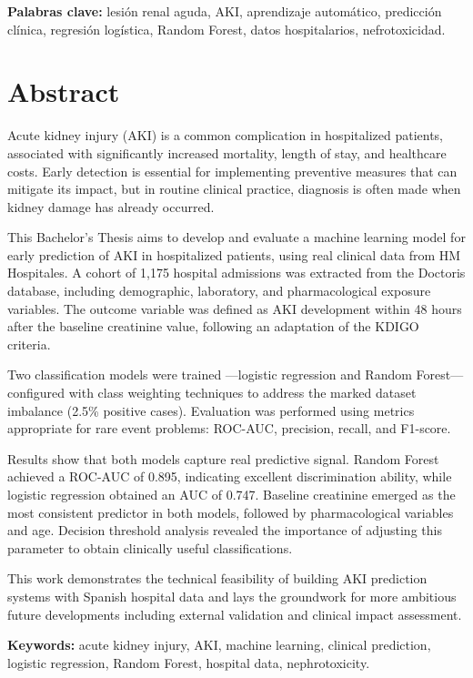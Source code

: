 \documentclass[12pt, a4paper, oneside]{report}
\begin{document}
\vspace{1cm}
\textbf{Palabras clave:} lesión renal aguda, AKI, aprendizaje automático, predicción clínica, regresión logística, Random Forest, datos hospitalarios, nefrotoxicidad.

\chapter*{Abstract}
Acute kidney injury (AKI) is a common complication in hospitalized patients, associated with significantly increased mortality, length of stay, and healthcare costs. Early detection is essential for implementing preventive measures that can mitigate its impact, but in routine clinical practice, diagnosis is often made when kidney damage has already occurred.

This Bachelor's Thesis aims to develop and evaluate a machine learning model for early prediction of AKI in hospitalized patients, using real clinical data from HM Hospitales. A cohort of 1,175 hospital admissions was extracted from the Doctoris database, including demographic, laboratory, and pharmacological exposure variables. The outcome variable was defined as AKI development within 48 hours after the baseline creatinine value, following an adaptation of the KDIGO criteria.

Two classification models were trained —logistic regression and Random Forest— configured with class weighting techniques to address the marked dataset imbalance (2.5\% positive cases). Evaluation was performed using metrics appropriate for rare event problems: ROC-AUC, precision, recall, and F1-score.

Results show that both models capture real predictive signal. Random Forest achieved a ROC-AUC of 0.895, indicating excellent discrimination ability, while logistic regression obtained an AUC of 0.747. Baseline creatinine emerged as the most consistent predictor in both models, followed by pharmacological variables and age. Decision threshold analysis revealed the importance of adjusting this parameter to obtain clinically useful classifications.

This work demonstrates the technical feasibility of building AKI prediction systems with Spanish hospital data and lays the groundwork for more ambitious future developments including external validation and clinical impact assessment.

\vspace{1cm}
\textbf{Keywords:} acute kidney injury, AKI, machine learning, clinical prediction, logistic regression, Random Forest, hospital data, nephrotoxicity.
\end{document}
